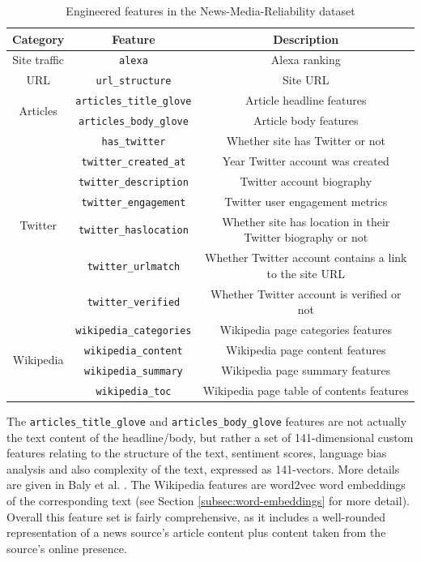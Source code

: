 \begin{table}[h!]
    \centering
    \begin{tabular}{|c|c|c|}
        \hline
        \textbf{Category} & \textbf{Feature} & \textbf{Description} \\
        \hline
        Site traffic & \texttt{alexa} & Alexa ranking \\
        \hline
        URL & \texttt{url\_structure} & Site URL \\
        \hline
        \multirow{2}{4em}{Articles} & \texttt{articles\_title\_glove} & Article headline features \\
        & \texttt{articles\_body\_glove} & Article body features \\
        \hline
        \multirow{7}{4em}{Twitter} & \texttt{has\_twitter} & Whether site has Twitter or not \\
        & \texttt{twitter\_created\_at} & Year Twitter account was created \\
        & \texttt{twitter\_description} & Twitter account biography \\
        & \texttt{twitter\_engagement} & Twitter user engagement metrics \\
        & \texttt{twitter\_haslocation} & Whether site has location in their Twitter biography or not \\
        & \texttt{twitter\_urlmatch} & Whether Twitter account contains a link to the site URL \\
        & \texttt{twitter\_verified} & Whether Twitter account is verified or not \\
        \hline
        \multirow{4}{4em}{Wikipedia} & \texttt{wikipedia\_categories} & Wikipedia page categories features \\
        & \texttt{wikipedia\_content} & Wikipedia page content features \\
        & \texttt{wikipedia\_summary} & Wikipedia page summary features \\
        & \texttt{wikipedia\_toc} &  Wikipedia page table of contents features \\
        \hline
    \end{tabular}
    \caption{Engineered features in the News-Media-Reliability dataset}
    \label{tab:nmr-features}
\end{table}

The \texttt{articles\_title\_glove} and \texttt{articles\_body\_glove} features are not actually the text content of the headline/body, but rather a set of 141-dimensional custom features relating to the structure of the text, sentiment scores, language bias analysis and also complexity of the text, expressed as 141-vectors. More details are given in Baly et al. \cite{baly-emnlp18}. The Wikipedia features are word2vec word embeddings of the corresponding text (see Section \ref{subsec:word-embeddings} for more detail). Overall this feature set is fairly comprehensive, as it includes a well-rounded representation of a news source's article content plus content taken from the source's online presence.

